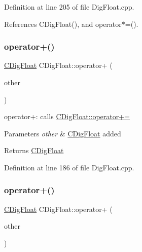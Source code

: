 Definition at line 205 of file Dig\+Float.\+cpp.



References C\+Dig\+Float(), and operator$\ast$=().

\mbox{\label{classCDigFloat_a1009b21039c6d32ec4be755251679153}} 
\subsubsection{\texorpdfstring{operator+()}{operator+()}\hspace{0.1cm}{\footnotesize\ttfamily [1/2]}}
{\footnotesize\ttfamily \hyperlink{classCDigFloat}{C\+Dig\+Float} C\+Dig\+Float\+::operator+ (\begin{DoxyParamCaption}\item[{const \hyperlink{classCDigFloat}{C\+Dig\+Float} \&}]{other }\end{DoxyParamCaption})}



operator+\+: calls \hyperlink{classCDigFloat_a84b2ad9b4d1a75aae261074ed7c6fefe}{C\+Dig\+Float\+::operator+=} 


\begin{DoxyParams}{Parameters}
{\em other} & \hyperlink{classCDigFloat}{C\+Dig\+Float} added \\
\hline
\end{DoxyParams}
\begin{DoxyReturn}{Returns}
\hyperlink{classCDigFloat}{C\+Dig\+Float} 
\end{DoxyReturn}


Definition at line 186 of file Dig\+Float.\+cpp.

\mbox{\label{classCDigFloat_a7fd363bbeb039e11fcc2d1b0ca628173}} 
\subsubsection{\texorpdfstring{operator+()}{operator+()}\hspace{0.1cm}{\footnotesize\ttfamily [2/2]}}
{\footnotesize\ttfamily \hyperlink{classCDigFloat}{C\+Dig\+Float} C\+Dig\+Float\+::operator+ (\begin{DoxyParamCaption}\item[{const double}]{other }\end{DoxyParamCaption})}



